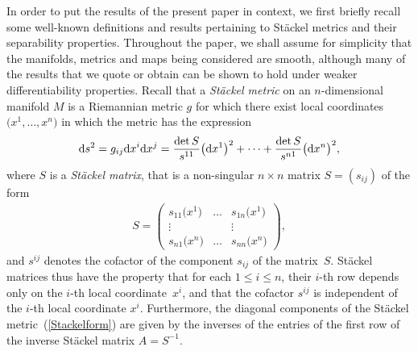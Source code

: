 \documentclass[pdftex]{sigma}
\numberwithin{equation}{section}
\begin{document}
In order to put the results of the present paper in context, we first briefly recall some well-known definitions and results pertaining to St\"ackel metrics and their separability properties. Throughout the paper, we shall assume for simplicity that the manifolds, metrics and maps being considered are smooth, although many of the results that we quote or obtain can be shown to hold under weaker differentiability properties. Recall \cite{BCR1-2002, Eis1934, KaMi1980, Sta1897} that a {\emph {St\"ackel metric}} on an $n$-dimensional manifold $M$ is a Riemannian metric $g$ for which there exist local coordinates $\big(x^{1},\dots,x^{n}\big)$ in which the metric has the expression
\begin{gather}\label{Stackelform}
{\rm d}s^{2}=g_{ij}{\rm d}x^{i}{\rm d}x^{j}=\frac{\det S}{s^{11}}\big({\rm d}x^{1}\big)^{2}+\cdots+\frac{\det S}{s^{n1}}\big({\rm d}x^{n}\big)^{2},
\end{gather}
where $S$ is a {\emph{St\"ackel matrix}}, that is a non-singular $n\times n$ matrix $S=(s_{ij})$ of the form
\begin{gather}\label{StackelMatrix}
S=\left(
\begin{matrix}
s_{11}\big(x^{1}\big)&\dots&s_{1n}\big(x^{1}\big) \\
\vdots& & \vdots \\
s_{n1}\big(x^{n}\big)&\dots&s_{nn}\big(x^{n}\big)
\end{matrix}
\right),
\end{gather}
and $s^{ij}$ denotes the cofactor of the component $s_{ij}$ of the matrix~$S$. St\"ackel matrices thus have the property that for each $1\leq i \leq n$, their $i$-th row depends only on the $i$-th local coordinate~$x^{i}$, and that the cofactor $s^{ij}$ is independent of the $i$-th local coordinate $x^{i}$. Furthermore, the diagonal components of the St\"ackel metric~(\ref{Stackelform}) are given by the inverses of the entries of the first row of the inverse St\"ackel matrix $A=S^{-1}$.
\end{document}
